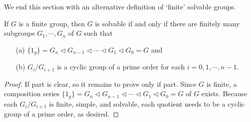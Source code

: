 We end this section with an alternative definition of `finite' solvable groups.
\begin{prop}
    If $G$ is a finite group, then $G$ is solvable if and only if there are finitely many subgroups $G_1, \cdots, G_n$ of $G$ such that
    \begin{enumerate}
        \item[(a)]
        {
            $\{1_g\}=G_n\triangleleft G_{n-1}\triangleleft \cdots\triangleleft G_1\triangleleft G_0=G$ and
        }
        \item[(b)]
        {
            $G_i/G_{i+1}$ is a cyclic group of a prime order for each $i=0, 1, \cdots, n-1$.
        }
    \end{enumerate}
\end{prop}
\begin{proof}
    If part is clear, so it remains to prove only if part.
    Since $G$ is finite, a composition series $\{1_g\}=G_n\triangleleft G_{n-1}\triangleleft \cdots\triangleleft G_1\triangleleft G_0=G$ of $G$ exists.
    Because each $G_i/G_{i+1}$ is finite, simple, and solvable, each quotient needs to be a cyclic group of a prime order, as desired.
\end{proof}